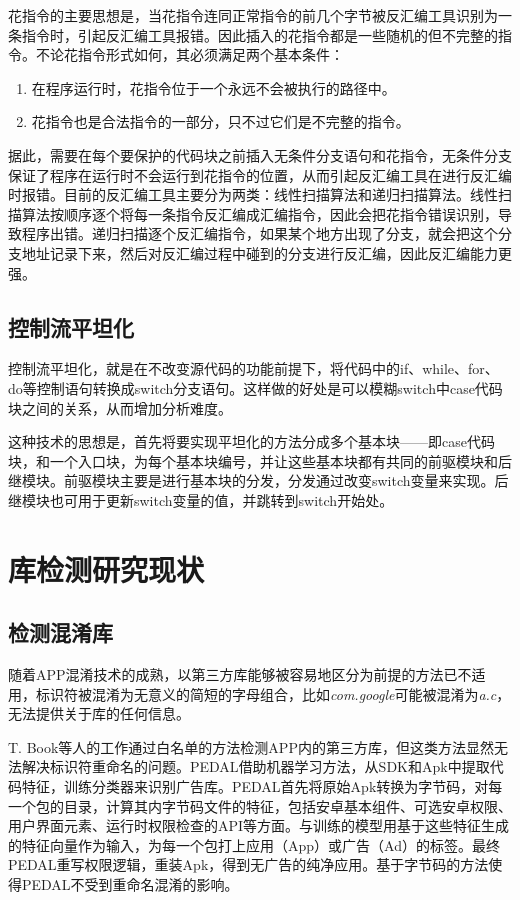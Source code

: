 花指令的主要思想是，当花指令连同正常指令的前几个字节被反汇编工具识别为一条指令时，引起反汇编工具报错。因此插入的花指令都是一些随机的但不完整的指令。不论花指令形式如何，其必须满足两个基本条件：
\begin{enumerate}
\item{在程序运行时，花指令位于一个永远不会被执行的路径中。}
\item{花指令也是合法指令的一部分，只不过它们是不完整的指令。}
\end{enumerate}

据此，需要在每个要保护的代码块之前插入无条件分支语句和花指令，无条件分支保证了程序在运行时不会运行到花指令的位置，从而引起反汇编工具在进行反汇编时报错。目前的反汇编工具主要分为两类：线性扫描算法和递归扫描算法。线性扫描算法按顺序逐个将每一条指令反汇编成汇编指令，因此会把花指令错误识别，导致程序出错\cite{huazhiling}。递归扫描逐个反汇编指令，如果某个地方出现了分支，就会把这个分支地址记录下来，然后对反汇编过程中碰到的分支进行反汇编，因此反汇编能力更强。

\subsection{控制流平坦化}
控制流平坦化，就是在不改变源代码的功能前提下，将代码中的if、while、for、do等控制语句转换成switch分支语句。这样做的好处是可以模糊switch中case代码块之间的关系，从而增加分析难度\cite{laszlo2009obfuscating}。

这种技术的思想是，首先将要实现平坦化的方法分成多个基本块——即case代码块，和一个入口块，为每个基本块编号，并让这些基本块都有共同的前驱模块和后继模块。前驱模块主要是进行基本块的分发，分发通过改变switch变量来实现。后继模块也可用于更新switch变量的值，并跳转到switch开始处。





\section{库检测研究现状}

\subsection{检测混淆库}
随着APP混淆技术的成熟，以第三方库能够被容易地区分为前提的方法已不适用，标识符被混淆为无意义的简短的字母组合，比如\textit{com.google}可能被混淆为\textit{a.c}，无法提供关于库的任何信息。



T. Book等人的工作通过白名单的方法检测APP内的第三方库\cite{book2013longitudinal}，但这类方法显然无法解决标识符重命名的问题。PEDAL\cite{liu2015efficient}借助机器学习方法，从SDK和Apk中提取代码特征，训练分类器来识别广告库。PEDAL首先将原始Apk转换为字节码，对每一个包的目录，计算其内字节码文件的特征，包括安卓基本组件、可选安卓权限、用户界面元素、运行时权限检查的API等方面。与训练的模型用基于这些特征生成的特征向量作为输入，为每一个包打上应用（App）或广告（Ad）的标签。最终PEDAL重写权限逻辑，重装Apk，得到无广告的纯净应用。基于字节码的方法使得PEDAL不受到重命名混淆的影响。


